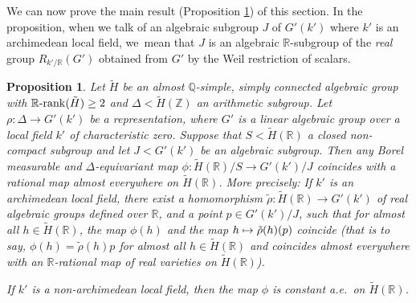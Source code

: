 \documentclass[JEP,XML,SOM,Unicode,published]{cedram}
\def\mto{\mathchoice{\longmapsto}{\mapsto}{\mapsto}{\mapsto}}
\newcommand{\Rrank}{\R\textup{-}\rank}
\newtheorem{proposition}[theorem]{Proposition}
\theoremstyle{definition}
\newcommand{\field}[1]{\mathbb{#1}}
\newcommand{\Q}{\field{Q}}
\newcommand{\R}{\field{R}}
\newcommand{\Z}{\field{Z}}
\newcommand{\rank}{{\operatorname{rank}}}
\begin{document}
We can now prove the main result (Proposition \ref{rational}) of this section. In the proposition, when we talk of an algebraic subgroup $J$ of $G'(k')$ where $k'$ is an archimedean local field, we~mean that $J$ is an algebraic $\R$-subgroup of the \emph{real} group $R_{k'/\R}(G')$ obtained from $G'$ by the Weil restriction of scalars.

\begin{proposition}\label{rational} Let $\tilde{H}$ be an almost $\Q$-simple, simply connected algebraic
group with $\Rrank(\tilde{H})\geq 2$ and $\Delta <\tilde{H}(\Z)$ an arithmetic subgroup. Let $\rho :\Delta \to G'(k')$ be a representation, where $G'$ is a linear algebraic group over a local field $k'$ of characteristic zero. Suppose that $S<\tilde{H}(\R)$ a closed non-compact subgroup and let $J<G'(k')$ be an algebraic subgroup. Then any Borel measurable and $\Delta$-equivariant map $\phi :\tilde H(\R)/S\to G'(k')/J$ coincides with a rational
map almost everywhere on $\tilde{H}(\R)$. More precisely:
If $k'$ is an archimedean local field, there exist a homomorphism
$\tilde \rho : \tilde H(\R) \to G'(k')$ of real algebraic groups
defined over $\R$, and a point $p\in G'(k')/J$, such that for almost all $h\in \tilde{H}(\R)$, the map $\phi
(h)$ and the map $h\mto \tilde \rho (h)(p)$ coincide (that is to say, $\phi (h)=\tilde \rho (h)p$ for almost all $h\in \tilde H(\R)$ and coincides almost everywhere with an $\R$-rational map of real varieties on $\tilde{H}(\R)$).

If $k'$ is a non-archimedean local field, then the map $\phi$ is constant a.e.\ on $\tilde{H}(\R)$.
\end{proposition}
\end{document}
